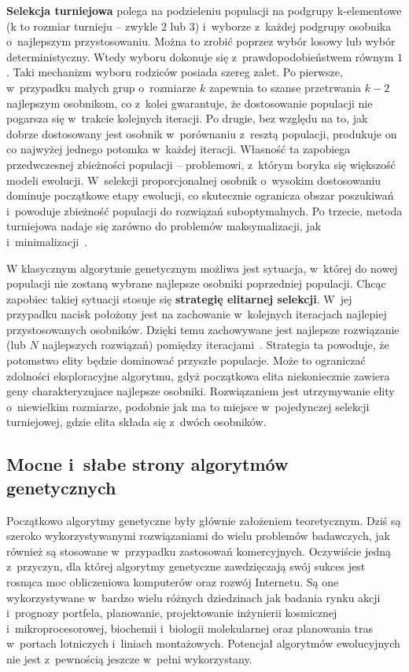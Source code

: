 \documentclass[twoside,12pt]{report}
\begin{document}
\textbf{Selekcja turniejowa} polega na podzieleniu populacji na podgrupy k-elementowe (k to rozmiar turnieju – zwykle $2$ lub $3$) i~wyborze z~każdej podgrupy osobnika o~najlepszym przystosowaniu. Można to zrobić poprzez wybór losowy lub wybór deterministyczny. Wtedy wyboru dokonuje się z~prawdopodobieństwem równym $1$. Taki mechanizm wyboru rodziców posiada szereg zalet. Po pierwsze, w~przypadku małych grup o~rozmiarze $k$ zapewnia to szanse przetrwania $k-2$ najlepszym osobnikom, co z~kolei gwarantuje, że dostosowanie populacji nie pogarsza się w~trakcie kolejnych iteracji. Po drugie, bez względu na to, jak dobrze dostosowany jest osobnik w~porównaniu z~resztą populacji, produkuje on co najwyżej jednego potomka w~każdej iteracji. Własność ta zapobiega przedwczesnej zbieżności populacji – problemowi, z~którym boryka się większość modeli ewolucji. W~selekcji proporcjonalnej osobnik o~wysokim dostosowaniu dominuje początkowe etapy ewolucji, co skutecznie ogranicza obszar poszukiwań i~powoduje zbieżność populacji do rozwiązań suboptymalnych. Po trzecie, metoda turniejowa nadaje się zarówno do problemów maksymalizacji, jak i~minimalizacji~\cite{genetyczne-immunologiczne}. 

W klasycznym algorytmie genetycznym możliwa jest sytuacja, w~której do nowej populacji nie zostaną wybrane najlepsze osobniki poprzedniej populacji. Chcąc zapobiec takiej sytuacji stosuje się \textbf{strategię elitarnej selekcji}. W~jej przypadku nacisk położony jest na zachowanie w~kolejnych iteracjach najlepiej przystosowanych osobników. Dzięki temu zachowywane jest najlepsze rozwiązanie (lub $N$ najlepszych rozwiązań) pomiędzy iteracjami~\cite{genetyczne-dane=ewo}. Strategia ta powoduje, że potomstwo elity będzie dominować przyszłe populacje. Może to ograniczać zdolności eksploracyjne algorytmu, gdyż początkowa elita niekoniecznie zawiera geny charakteryzujace najlepsze osobniki. Rozwiązaniem jest utrzymywanie elity o~niewielkim rozmiarze, podobnie jak ma to miejsce w~pojedynczej selekcji turniejowej, gdzie elita składa się z~dwóch osobników.

\subsection{Mocne i~słabe strony algorytmów genetycznych}
Początkowo algorytmy genetyczne były głównie założeniem teoretycznym. Dziś są szeroko wykorzystywanymi rozwiązaniami do wielu problemów badawczych, jak również są stosowane w~przypadku zastosowań komercyjnych. Oczywiście jedną z~przyczyn, dla której algorytmy genetyczne zawdzięczają swój sukces jest rosnąca moc obliczeniowa komputerów oraz rozwój Internetu. Są one wykorzystywane w~bardzo wielu różnych dziedzinach jak badania rynku akcji i~prognozy portfela, planowanie, projektowanie inżynierii kosmicznej i~mikroprocesorowej, biochemii i~biologii molekularnej oraz planowania tras w~portach lotniczych i~liniach montażowych. Potencjał algorytmów ewolucyjnych nie jest z~pewnością jeszcze w~pełni wykorzystany.
\end{document}
